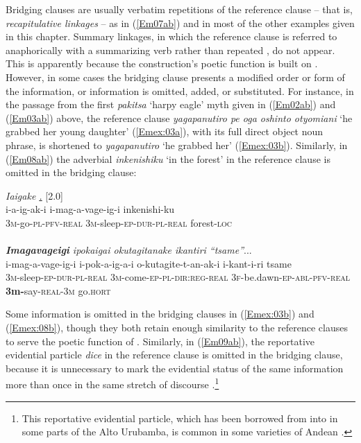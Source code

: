 \documentclass[output=paper]{LSP/langsci}
\begin{document}
 
Bridging clauses are usually verbatim repetitions of the reference clause – that is, \textit{recapitulative linkages} – as in (\ref{Em07ab}) and in most of the other examples given in this chapter. Summary linkages, in which the reference clause is referred to anaphorically with a summarizing verb rather than repeated , do not appear. This is apparently because the construction’s poetic function is built on . However, in some cases the bridging clause presents a modified order or form of the information, or information is omitted, added, or substituted. For instance, in the passage from the first \textit{pakitsa} `harpy eagle' myth given in (\ref{Em02ab}) and (\ref{Em03ab}) above, the reference clause \textit{yagapanutiro pe oga oshinto otyomiani} `he grabbed her young daughter' (\ref{Emex:03a}), with its full direct object noun phrase, is shortened to \textit{yagapanutiro} `he grabbed her' (\ref{Emex:03b}). Similarly, in (\ref{Em08ab}) the adverbial \textit{inkenishiku} `in the forest' in the reference clause is omitted in the bridging clause:

\begin{exe}
\ex \label{Em08ab}
\begin{xlist}
\ex \label{Emex:08a}
\glt \textit{Iaigake \underline{.}} [2.0]\\
\gll i-a-ig-ak-i i-mag-a-vage-ig-i inkenishi-ku \\
 \textsc{3m-}go\textsc{-pl-pfv-real} \textsc{3m-}sleep\textsc{-ep-dur-pl-real} forest\textsc{-loc}\\
\glt {}\\
\ex \label{Emex:08b}
\glt \textit{\textbf{Imagavageigi} ipokaigai okutagitanake ikantiri ``tsame''}...\\
\gll i-mag-a-vage-ig-i i-pok-a-ig-a-i o-kutagite-t-an-ak-i i-kant-i-ri tsame\\     	      
   \textsc{3m-}sleep\textsc{-ep-dur-pl-real} \textsc{3m-}come\textsc{-ep-pl-dir:reg-real} \textsc{3f-}be.dawn\textsc{-ep-abl-pfv-real} \textbf{3m-}say\textsc{-real-3m} go.\textsc{hort}\\
\glt {}
\end{xlist}
\end{exe}


%
Some information is omitted in the bridging clauses in (\ref{Emex:03b}) and (\ref{Emex:08b}), though they both retain enough similarity to the reference clauses to serve the poetic function of . Similarly, in (\ref{Em09ab}), the  reportative evidential particle \textit{dice} in the reference clause is omitted in the bridging clause, because it is unnecessary to mark the evidential status of the same information more than once in the same stretch of discourse \citep[for a similar case in , see][392]{schulze73}.\footnote{This reportative evidential particle, which has been borrowed from  into  in some parts of the {Alto Urubamba}, is common in some varieties of Andean  \citep[as well as its variant \textit{dizque}; see][]{babel.2009}.} 
\end{document}
